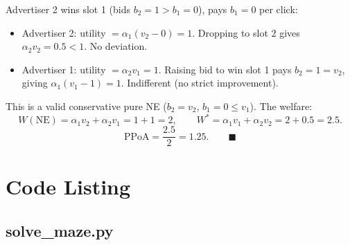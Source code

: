 \documentclass{article}
\begin{document}
Advertiser 2 wins slot 1 (bids $b_2 = 1 > b_1 = 0$), pays $b_1 = 0$ per click:
\begin{itemize}
    \item Advertiser 2: utility $= \alpha_1(v_2 - 0) = 1$. Dropping to slot 2 gives $\alpha_2 v_2 = 0.5 < 1$. No deviation. 
    \item Advertiser 1: utility $= \alpha_2 v_1 = 1$. Raising bid to win slot 1 pays $b_2 = 1 = v_2$, giving $\alpha_1(v_1 - 1) = 1$. Indifferent (no strict improvement). 
\end{itemize}
This is a valid conservative pure NE ($b_2 = v_2$, $b_1 = 0 \leq v_1$). The welfare:
$$W(\text{NE}) = \alpha_1 v_2 + \alpha_2 v_1 = 1 + 1 = 2, \qquad W^* = \alpha_1 v_1 + \alpha_2 v_2 = 2 + 0.5 = 2.5.$$
$$\text{PPoA} = \frac{2.5}{2} = 1.25. \qquad \blacksquare$$

\appendix
\section{Code Listing}
\label{sec:code}


\subsection*{solve\_maze.py}
\label{sec:maze_code}

\end{document}
